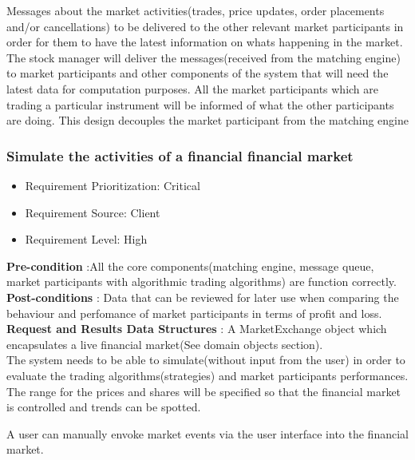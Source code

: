 \documentclass[12pt]{article}
\begin{document}
			Messages about the market activities(trades, price updates, order placements and/or cancellations) to be delivered to the other relevant market participants in order for them to have the latest information on whats happening in the market. The stock manager will deliver the messages(received from the matching engine) to market participants and other components of the system that will need the latest data for computation purposes. All the market participants which are trading a particular instrument will be informed of what the other participants are doing. This design decouples the market participant from the matching engine
	\pagebreak		
			\subsubsection{Simulate the activities of a financial financial market}
			\begin{itemize}
				\item Requirement Prioritization: Critical
				\item Requirement Source: Client 
				\item Requirement Level: High	
			\end{itemize}
			
			\textbf{Pre-condition} :All the core components(matching engine, message queue, market participants with algorithmic trading algorithms) are function correctly.\\
			\textbf{Post-conditions} : Data that can be reviewed for later use when comparing the behaviour and perfomance of market participants in terms of profit and loss.\\ 
			\textbf{Request and Results Data Structures} : A MarketExchange object which encapsulates a live financial market(See domain objects section).\\
						
			The system needs to be able to simulate(without input from the user) in order to evaluate the trading algorithms(strategies) and market participants performances. The range for the prices and shares will be specified so that the financial market is controlled and trends can be spotted. 
			
			A user can manually envoke market events via the user interface into the financial market.
			
\end{document}
